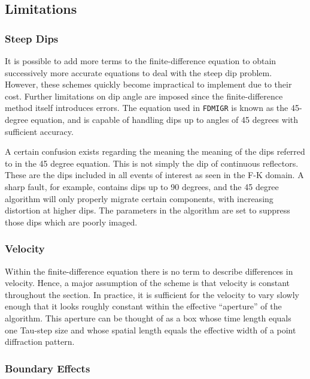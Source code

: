 \subsection{Limitations}


\subsubsection{Steep Dips}

It is possible to add more terms to the finite-difference equation to
obtain successively more accurate equations to deal with the steep dip
problem.  However, these schemes quickly become impractical to implement
due to their cost.  Further limitations on dip angle are imposed since
the finite-difference method itself introduces errors.  The equation
used in \texttt{FDMIGR} is known as the 45-degree equation, and is capable of
handling dips up to angles of 45 degrees with sufficient accuracy.

A certain confusion exists regarding the meaning the meaning of the dips
referred to in the 45 degree equation. This is not simply the dip of
continuous reflectors.  These are the dips included in all events of
interest as seen in the F-K domain.  A sharp fault, for example,
contains dips up to 90 degrees, and the 45 degree algorithm will only
properly migrate certain components, with increasing distortion at
higher dips.  The parameters in the algorithm are set to suppress those
dips which are poorly imaged.


\subsubsection{Velocity}

Within the finite-difference equation there is no term to describe
differences in velocity. Hence, a major assumption of the scheme is that
velocity is constant throughout the section.  In practice, it is
sufficient for the velocity to vary slowly enough that it looks roughly
constant within the effective ``aperture'' of the algorithm.  This
aperture can be thought of as a box whose time length equals one
Tau-step size and whose spatial length equals the effective width of a
point diffraction pattern.


\subsubsection{Boundary Effects}

